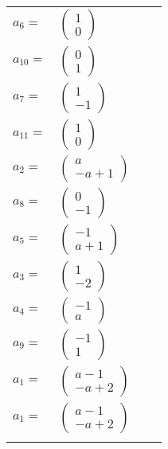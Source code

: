\documentclass[1p]{elsarticle_modified}
\theoremstyle{definition}
\begin{document}
\begin{tabular}{m{7pt} m{180pt} m{7pt} m{180pt} }
\flushright $a_{6}=$&$\begin{pmatrix}1\\0\end{pmatrix}$ \\
\flushright $a_{10}=$&$\begin{pmatrix}0\\1\end{pmatrix}$ \\
\flushright $a_{7}=$&$\begin{pmatrix}1\\-1\end{pmatrix}$ \\
\flushright $a_{11}=$&$\begin{pmatrix}1\\0\end{pmatrix}$ \\
\flushright $a_{2}=$&$\begin{pmatrix}a\\- a+1\end{pmatrix}$ \\
\flushright $a_{8}=$&$\begin{pmatrix}0\\-1\end{pmatrix}$ \\
\flushright $a_{5}=$&$\begin{pmatrix}-1\\a+1\end{pmatrix}$ \\
\flushright $a_{3}=$&$\begin{pmatrix}1\\-2\end{pmatrix}$ \\
\flushright $a_{4}=$&$\begin{pmatrix}-1\\a\end{pmatrix}$ \\
\flushright $a_{9}=$&$\begin{pmatrix}-1\\1\end{pmatrix}$ \\
\flushright $a_{1}=$&$\begin{pmatrix}a-1\\- a+2\end{pmatrix}$\\ \flushright $a_{1}=$&$\begin{pmatrix}a-1\\- a+2\end{pmatrix}$\\&\end{tabular}
\end{document}
